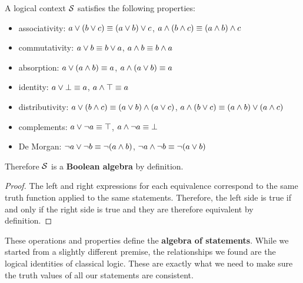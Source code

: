 \documentclass[11pt,letterpaper,fleqn]{memoir} %
\begin{document}
\begin{mathSection}
\begin{coro}\label{boolean_properties}
	A logical context $\mathcal{S}$ satisfies the following properties:
	\begin{itemize}
		\item associativity: $a \vee (b \vee c) \equiv (a \vee b) \vee c$, $a \wedge (b \wedge c) \equiv (a \wedge b) \wedge c$
		\item commutativity: $a \vee b \equiv b \vee a$, $a \wedge b \equiv b \wedge a$
		\item absorption: $a \vee (a \wedge b) \equiv a$, $a \wedge (a \vee b) \equiv a$
		\item identity: $a \vee \bot \equiv a
		$, $a \wedge \top \equiv a$
		\item distributivity: $a \vee (b \wedge c) \equiv (a \vee b) \wedge (a \vee c)$, $a \wedge (b \vee c) \equiv (a \wedge b) \vee (a \wedge c)$
		\item complements: $a \vee \neg a \equiv \top$, $a \wedge \neg a \equiv \bot$
		\item De Morgan: $\neg a \vee \neg b \equiv \neg (a \wedge b)$, $\neg a \wedge \neg b \equiv \neg (a \vee b)$
	\end{itemize}
	Therefore $\mathcal{S}$ is a \textbf{Boolean algebra} by definition.
\end{coro}
\begin{proof}
	The left and right expressions for each equivalence correspond to the same truth function applied to the same statements. Therefore, the left side is true if and only if the right side is true and they are therefore equivalent by definition.
\end{proof}
\end{mathSection}

These operations and properties define the \textbf{algebra of statements}. While we started from a slightly different premise, the relationships we found are the logical identities of classical logic. These are exactly what we need to make sure the truth values of all our statements are consistent.
\end{document}
